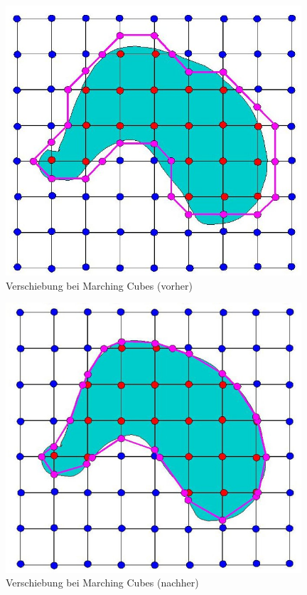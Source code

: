 		\begin{minipage}[t]{0.22\textwidth}
			\begin{figure}[H]
			\centering
			\includegraphics[width=0.98\textwidth]{figures/VerschiebenBeiMarchingCubes1}
			\caption[Marching Cubes Verschiebung (vorher)\cite{iomc}]{Verschiebung bei Marching Cubes (vorher) \label{VerschiebenBeiMarchingCubes1}}
			\end{figure}
			\end{minipage}
			\begin{minipage}[t]{0.22\textwidth}
			\begin{figure}[H]
			\centering
			\includegraphics[width=0.98\textwidth]{figures/VerschiebenBeiMarchingCubes2}
			\caption[Marching Cubes Verschiebung (nacher)\cite{iomc}]{Verschiebung bei Marching Cubes (nachher) \label{VerschiebenBeiMarchingCubes2}}
			\end{figure}
			\end{minipage}

